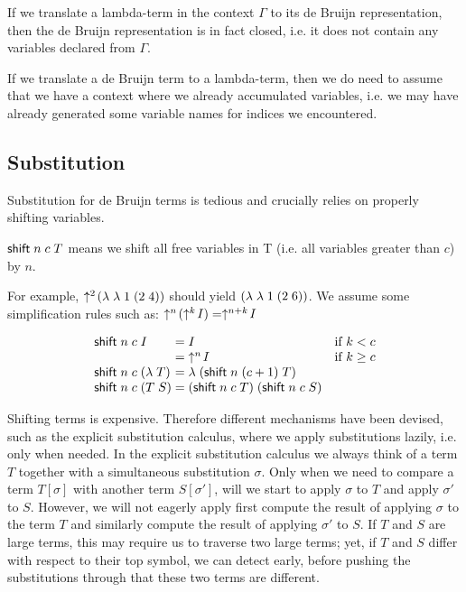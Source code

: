 If we translate a lambda-term in the context $\Gamma$ to its de Bruijn
representation, then the de Bruijn representation is in fact closed,
i.e. it does not contain any variables declared from $\Gamma$.

If we translate a de Bruijn term to a lambda-term, then we do need to
assume that we have a context where we already accumulated variables,
i.e. we may have already generated some variable names for indices we
encountered.

\subsection*{Substitution} Substitution for de Bruijn terms is tedious
and crucially relies on properly shifting variables.


$\mathsf{shift}\;n\;c\;T$ means we shift all free variables in T (i.e. all
variables greater than $c$) by $n$.

For example, $\uparrow^{2}\!(\lambda\; \lambda\; 1 \; (2 \; 4))$ should yield
$(\lambda\; \lambda\; 1 \; (2 \; 6))$. We assume some simplification rules
such as: $\uparrow^{n}\!(\uparrow^{k}\!I) = \uparrow^{n+k}\!I$

\[
\begin{array}{l@{\;=\;}ll}
\ShiftBy n c I & I  & \mbox{if } k < c \\
               & \shiftn n I &\mbox{if } k \geq c \\
\ShiftBy n c (\lamdb T) & \lamdb (\ShiftBy n {(c+1)} T)\\
\ShiftBy n c (T \app S) & (\ShiftBy n c T) \app (\ShiftBy n c S)
\end{array}
\]


Shifting terms is expensive. Therefore different mechanisms have
been devised, such as the explicit substitution calculus, where we
apply substitutions lazily, i.e. only when needed. In the explicit
substitution calculus we always think of a term $T$ together with a
simultaneous substitution $\sigma$. Only when we need to compare a term
$T[\sigma]$ with another term $S[\sigma']$, will we start to apply
$\sigma$ to $T$ and  apply $\sigma'$ to $S$. However, we will not
eagerly apply first compute the result of applying $\sigma$ to the
term $T$ and similarly compute the result of applying $\sigma'$ to
$S$. If $T$ and $S$ are large terms, this may require us to traverse
two large terms; yet, if $T$ and $S$ differ with respect to their top
symbol, we can detect early, before pushing the substitutions through
that these two terms are different.



